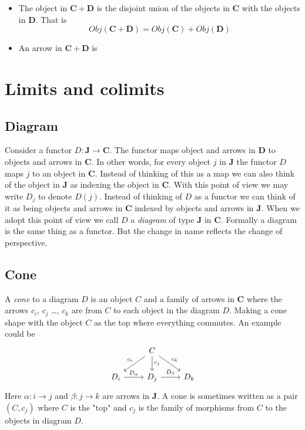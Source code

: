 \documentclass{book}
\theoremstyle{definition}
\begin{document}
\begin{itemize}
\item The object in $\mathbf{C} + \mathbf{D}$ is the disjoint union of the
  objects in $\mathbf{C}$ with the objects in $\mathbf{D}$. That is
  \[
    Obj(\mathbf{C} + \mathbf{D}) = Obj(\mathbf{C}) + Obj(\mathbf{D})
  \]
\item An arrow in $\mathbf{C} + \mathbf{D}$ is
\end{itemize}

\chapter{Limits and colimits}

\section{Diagram}

Consider a functor $D : \textbf{J} \to \textbf{C}$. The functor maps object and
arrows in \textbf{D} to objects and arrows in \textbf{C}. In other words, for
every object $j$ in \textbf{J} the functor $D$ maps $j$ to an object in
\textbf{C}. Instead of thinking of this as a map we can also think of the object
in \textbf{J} as indexing the object in \textbf{C}. With this point of view we
may write $D_{j}$ to denote $D(j)$. Instead of thinking of $D$ as a functor we
can think of it as being objects and arrows in \textbf{C} indexed by objects and
arrows in \textbf{J}. When we adopt this point of view we call $D$ a
\emph{diagram} of type \textbf{J} in \textbf{C}. Formally a diagram is the same
thing as a functor. But the change in name reflects the change of perspective.

\section{Cone}

A \emph{cone} to a diagram $D$ is an object $C$ and a family of arrows in
\textbf{C} where the arrows $c_i$, $c_j$ \dots, $c_k$ are from $C$ to each
object in the diagram $D$. Making a cone shape with the object $C$ as the top
where everything commutes. An example could be
\[
\begin{tikzcd}
  & C \arrow[dl, "c_i"'] \arrow[d, "c_j"] \arrow[dr, "c_k"]  \\
  D_i \arrow[r,"D_\alpha"] & D_j \arrow[r, "D_\beta"]  & D_k
\end{tikzcd}
\]
Here $\alpha : i \to j$ and $\beta : j \to k$ are arrows in \textbf{J}. A cone is sometimes
written as a pair $(C, c_j)$ where $C$ is the "top" and $c_j$ is the family of
morphisms from $C$ to the objects in diagram $D$.
\end{document}
